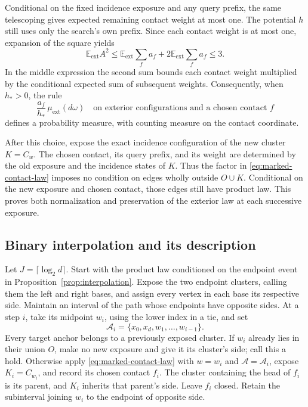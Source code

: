 \documentclass[11pt]{article}
\theoremstyle{definition}
\begin{document}
Conditional on the fixed incidence exposure and any query prefix, the
same telescoping gives expected remaining contact weight at most one.
The potential $h$ still uses only the search's own prefix. Since each
contact weight is at most one,
expansion of the square yields
\begin{equation}\label{eq:contact-second-moment}
 \mathbb E_{\mathrm{ext}}A^2
 \le \mathbb E_{\mathrm{ext}}\sum_f a_f
       +2\mathbb E_{\mathrm{ext}}\sum_f a_f
 \le3.
\end{equation}
In the middle expression the second sum bounds each contact weight
multiplied by the conditional expected sum of subsequent weights.
Consequently, when $h_*>0$, the rule
\begin{equation}\label{eq:marked-contact-law}
 \frac{a_f}{h_*}\,\mu_{\mathrm{ext}}(d\omega)
 \quad\text{on exterior configurations and a chosen contact }f
\end{equation}
defines a probability measure, with counting measure on the contact
coordinate.

After this choice, expose the exact incidence configuration of the
new cluster $K=C_w$. The chosen contact, its query prefix, and its
weight are determined by the old exposure and the incidence states of
$K$. Thus the factor in \eqref{eq:marked-contact-law} imposes no
condition on edges wholly outside $O\cup K$. Conditional on the new
exposure and chosen contact, those edges still have product law.
This proves both normalization and preservation of the exterior law
at each successive exposure.

\subsection{Binary interpolation and its description}

Let $J=\lceil\log_2d\rceil$. Start with the product law conditioned
on the endpoint event in Proposition~\ref{prop:interpolation}. Expose
the two endpoint clusters, calling them the left and right bases, and
assign every vertex in each base its respective side.
Maintain an interval of the path whose endpoints have opposite sides.
At a step $i$, take its midpoint $w_i$, using the lower index in a tie,
and set
\[
 \mathcal A_i=\{x_0,x_d,w_1,\ldots,w_{i-1}\}.
\]
Every target anchor belongs to a previously exposed cluster. If $w_i$
already lies in their union $O$, make no new exposure and give it its
cluster's side; call this a hold. Otherwise apply
\eqref{eq:marked-contact-law} with $w=w_i$ and
$\mathcal A=\mathcal A_i$, expose $K_i=C_{w_i}$, and record its
chosen contact $f_i$. The cluster containing the head of $f_i$ is its
parent, and $K_i$ inherits that parent's side. Leave $f_i$ closed.
Retain the subinterval joining $w_i$ to the endpoint of opposite side.
\end{document}
